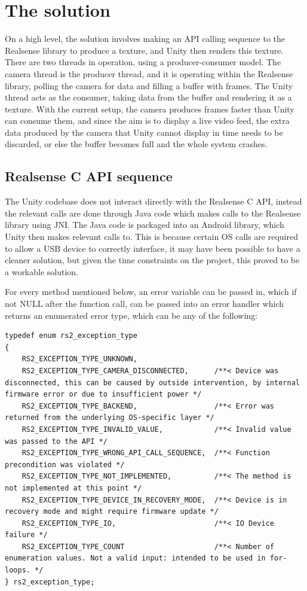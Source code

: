 \section{The solution}
    On a high level, the solution involves making an API calling sequence to the Realsense library to produce a texture, and Unity then renders this texture. There are two threads in operation, using a producer-consumer model. The camera thread is the producer thread, and it is operating within the Realsense library, polling the camera for data and filling a buffer with frames. The Unity thread acts as the consumer, taking data from the buffer and rendering it as a texture. With the current setup, the camera produces frames faster than Unity can consume them, and since the aim is to display a live video feed, the extra data produced by the camera that Unity cannot display in time needs to be discarded, or else the buffer becomes full and the whole system crashes.

    \subsection{Realsense C API sequence}
    The Unity codebase does not interact directly with the Realsense C API, instead the relevant calls are done through Java code which makes calls to the Realsense library using JNI. The Java code is packaged into an Android library, which Unity then makes relevant calls to. This is because certain OS calls are required to allow a USB device to correctly interface, it may have been possible to have a cleaner solution, but given the time constraints on the project, this proved to be a workable solution.

    For every method mentioned below, an error variable can be passed in, which if not NULL after the function call, can be passed into an error handler which returns an enumerated error type, which can be any of the following:

    \begin{lstlisting}[style=CStyle]
typedef enum rs2_exception_type
{
    RS2_EXCEPTION_TYPE_UNKNOWN,
    RS2_EXCEPTION_TYPE_CAMERA_DISCONNECTED,      /**< Device was disconnected, this can be caused by outside intervention, by internal firmware error or due to insufficient power */
    RS2_EXCEPTION_TYPE_BACKEND,                  /**< Error was returned from the underlying OS-specific layer */
    RS2_EXCEPTION_TYPE_INVALID_VALUE,            /**< Invalid value was passed to the API */
    RS2_EXCEPTION_TYPE_WRONG_API_CALL_SEQUENCE,  /**< Function precondition was violated */
    RS2_EXCEPTION_TYPE_NOT_IMPLEMENTED,          /**< The method is not implemented at this point */
    RS2_EXCEPTION_TYPE_DEVICE_IN_RECOVERY_MODE,  /**< Device is in recovery mode and might require firmware update */
    RS2_EXCEPTION_TYPE_IO,                       /**< IO Device failure */
    RS2_EXCEPTION_TYPE_COUNT                     /**< Number of enumeration values. Not a valid input: intended to be used in for-loops. */
} rs2_exception_type;\end{lstlisting}

